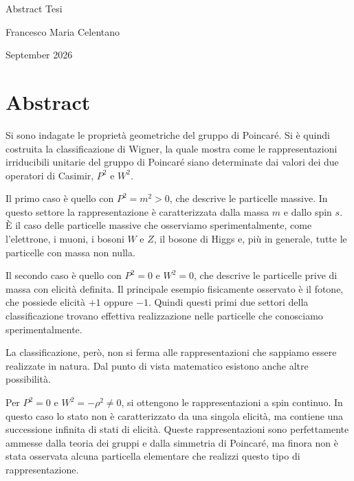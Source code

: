 \documentclass[10pt,a4paper]{article}
\begin{document}
\begin{center}
    {\Large Abstract Tesi}

    \vspace{0.5em}

    Francesco Maria Celentano

    \vspace{0.25em}

    September 2026
\end{center}

\vspace{0.4em}

\section{Abstract}

\small

Si sono indagate le proprietà geometriche del gruppo di Poincaré.
Si è quindi costruita la classificazione di Wigner, la quale mostra come
le rappresentazioni irriducibili unitarie del gruppo di Poincaré
siano determinate dai valori dei due operatori di Casimir, $P^2$ e
$W^2$.

Il primo caso è quello con $P^2 = m^2 > 0$, che descrive le particelle
massive. In questo settore la rappresentazione è caratterizzata dalla
massa $m$ e dallo spin $s$. È il caso delle particelle massive che
osserviamo sperimentalmente, come l'elettrone, i muoni, i bosoni $W$ e
$Z$, il bosone di Higgs e, più in generale, tutte le particelle con
massa non nulla.

Il secondo caso è quello con $P^2 = 0$ e $W^2 = 0$, che descrive le
particelle prive di massa con elicità definita. Il principale esempio
fisicamente osservato è il fotone, che possiede elicità $+1$ oppure
$-1$. Quindi questi primi due settori della classificazione trovano
effettiva realizzazione nelle particelle che conosciamo
sperimentalmente.

La classificazione, però, non si ferma alle rappresentazioni che
sappiamo essere realizzate in natura. Dal punto di vista matematico
esistono anche altre possibilità.

Per $P^2 = 0$ e $W^2 = -\rho^2 \neq 0$, si ottengono le rappresentazioni
a spin continuo. In questo caso lo stato non è caratterizzato da una
singola elicità, ma contiene una successione infinita di stati di
elicità. Queste rappresentazioni sono perfettamente ammesse dalla
teoria dei gruppi e dalla simmetria di Poincaré, ma finora non è stata
osservata alcuna particella elementare che realizzi questo tipo di
rappresentazione.
\end{document}
